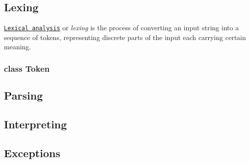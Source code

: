 \subsection*{Lexing}

\href{https://en.wikipedia.org/wiki/Lexical_analysis}{\tt Lexical analysis} or {\itshape lexing} is the process of converting an input string into a sequence of tokens, representing discrete parts of the input each carrying certain meaning.

\subsubsection*{class Token}

\subsection*{Parsing}

\subsection*{Interpreting}

\subsection*{Exceptions}